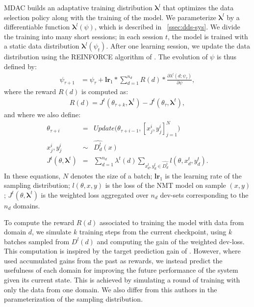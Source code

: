 \documentclass[11pt]{article}
\newcommand{\fyTodo}[1]{\Todo[FY:]{\textcolor{orange}{#1}}}
\newcommand{\vlambda}{\ensuremath{\boldsymbol\lambda}\xspace} %
\begin{document}
MDAC builds an adaptative training distribution $\vlambda^{l}$ that optimizes the data selection policy along with the training of the model. We parameterize $\vlambda^{l}$ by a differentiable function $\vlambda^l(\psi)$, which is described in \textsection~\ref{ssec:dds-sys}. We divide the training into many short sessions; in each session $t$, the model is trained with a static data distribution $\vlambda^{l}(\psi_t)$. After one learning session, we update the data distribution using the REINFORCE algorithm of . The evolution of $\psi$ is thus defined by:\fyTodo{$t$ is both for time, and for test - change into $\tau$?}
\begin{align*}
\psi_{\tau+1} &= \psi_{\tau} + \mathbf{lr}_{1} * \displaystyle{\mathop{\sum}_{d=1}^{n_d}} R(d) * \frac{\partial \lambda^l(d;\psi_{\tau})}{\partial \psi},
\end{align*}
\begingroup
\allowdisplaybreaks
where the reward $R(d)$ is computed as:
\begin{align}
  R(d) = J^t(\theta_{\tau+k},\vlambda^t) - J^t(\theta_\tau,\vlambda^t), \label{eq:reward}
\end{align}
and where we also define:
\begin{equation}
\begin{array}{rcl}
\theta_{\tau+i} &=& Update\big(\theta_{\tau+i-1},[x^i_j,y^i_j]_{j=1}^N\big) \\ \nonumber
x^i_j, y^i_j &\sim& \widehat{D^l_d}(x) \\
J^t(\theta,\vlambda^t) &=& \displaystyle{\mathop{\sum}_{d=1}^{n_d}}\lambda^t(d)\displaystyle{\mathop{\sum}_{x^t_d,y^t_d \in \widehat{D^t_d}}} l(\theta,x^t_d,y^t_d).
\end{array}
\end{equation}
\endgroup
In these equations, $N$ denotes the size of a batch; $\mathbf{lr}_{1}$ is the learning rate of the sampling distribution; $l(\theta,x,y)$ is the loss of the NMT model on sample $(x,y)$; $J^t(\theta,\vlambda^t)$ is the weighted loss aggregated over $n_d$ dev-sets corresponding to the $n_d$ domains.

To compute the reward $R(d)$ associated to training the model with data from domain $d$, we simulate $k$ training steps from the current checkpoint, using $k$ batches sampled from $D^l(d)$ and computing the gain of the weighted dev-loss. This computation is inspired by the target prediction gain of . However, where  used accumulated gains from the past as rewards, we instead predict the usefulness of each domain for improving the future performance of the system given its current state. This is achieved by simulating a round of training with only the data from one domain. We also differ from this authors in the parameterization of the sampling distribution.
\end{document}
